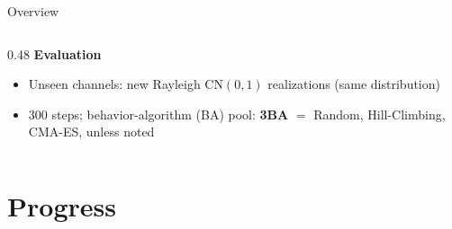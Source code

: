\documentclass[10pt,aspectratio=169]{beamer}
\newenvironment{tightitemize}{%
    \begin{itemize}
        \setlength{\itemsep}{2pt}
        \setlength{\parskip}{0pt}
        \setlength{\parsep}{0pt}
}{%
    \end{itemize}
}
\begin{document}
\begin{frame}{Overview}
\begin{columns}[T,onlytextwidth]
\begin{column}{0.48\textwidth}
            \vspace{0.5em}
            \textbf{Evaluation}
            \begin{tightitemize}
                \item Unseen channels: new Rayleigh $\mathrm{CN}(0,1)$ realizations (same distribution)
                \item 300 steps; behavior-algorithm (BA) pool: \textbf{3BA} $=$ Random, Hill-Climbing, CMA-ES, unless noted
            \end{tightitemize}
        \end{column}
    \end{columns}
\end{frame}

\section{Progress}
\end{document}
